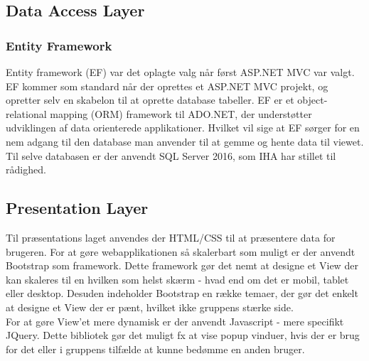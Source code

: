  \subsection{Data Access Layer}
 
 \subsubsection{Entity Framework}
 Entity framework (EF) var det oplagte valg når først ASP.NET MVC var valgt. EF kommer som standard når der oprettes et ASP.NET MVC projekt, og opretter selv en skabelon til at oprette database tabeller. EF er et object-relational mapping (ORM) framework til ADO.NET, der understøtter udviklingen af data orienterede applikationer. Hvilket vil sige at EF sørger for en nem adgang til den database man anvender til at gemme og hente data til viewet. \\
 \noindent Til selve databasen er der anvendt SQL Server 2016, som IHA har stillet til rådighed.
 
 \subsection{Presentation Layer}
 Til præsentations laget anvendes der HTML/CSS til at præsentere data for brugeren. For at gøre webapplikationen så skalerbart som muligt er der anvendt Bootstrap som framework. Dette framework gør det nemt at designe et View der kan skaleres til en hvilken som helst skærm - hvad end om det er mobil, tablet eller desktop. Desuden indeholder Bootstrap en række temaer, der gør det enkelt at designe et View der er pænt, hvilket ikke gruppens stærke side. \\
 For at gøre View'et mere dynamisk er der anvendt Javascript - mere specifikt JQuery. Dette bibliotek gør det muligt fx at vise popup vinduer, hvis der er brug for det eller i gruppens tilfælde at kunne bedømme en anden bruger.